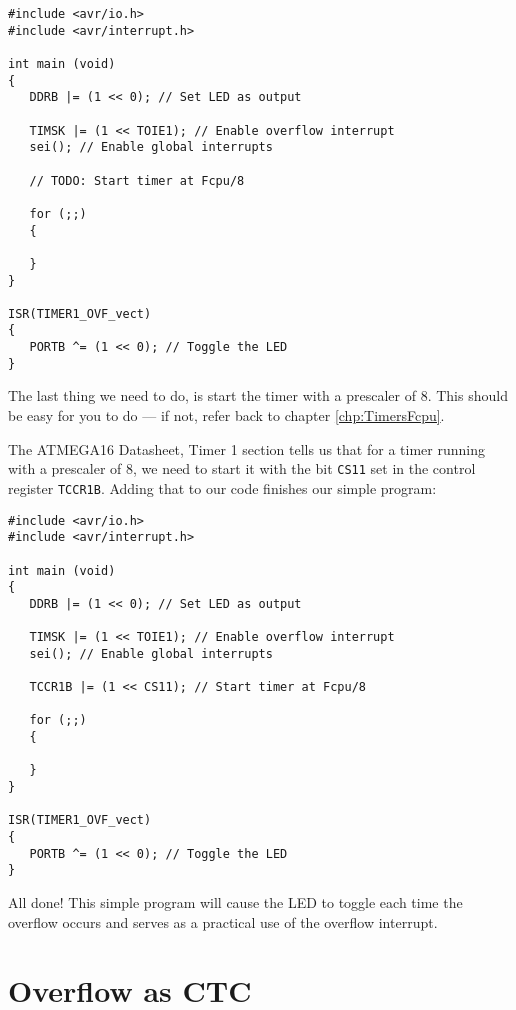 \documentclass[a4paper,oneside,notitlepage]{book}
\begin{document}
\begin{center}
\begin{lstlisting}
#include <avr/io.h>
#include <avr/interrupt.h>

int main (void)
{
   DDRB |= (1 << 0); // Set LED as output

   TIMSK |= (1 << TOIE1); // Enable overflow interrupt
   sei(); // Enable global interrupts

   // TODO: Start timer at Fcpu/8

   for (;;)
   {

   }
}

ISR(TIMER1_OVF_vect)
{
   PORTB ^= (1 << 0); // Toggle the LED
}
\end{lstlisting}
\end{center}

The last thing we need to do, is start the timer with a prescaler of 8. This should be easy for you to do --- if not, refer back to chapter \ref{chp:TimersFcpu}.

The ATMEGA16 Datasheet, Timer 1 section tells us that for a timer running with a prescaler of 8, we need to start it with the bit \texttt{CS11} set in the control register \texttt{TCCR1B}. Adding that to our code finishes our simple program:

\begin{center}
\begin{lstlisting}
#include <avr/io.h>
#include <avr/interrupt.h>

int main (void)
{
   DDRB |= (1 << 0); // Set LED as output

   TIMSK |= (1 << TOIE1); // Enable overflow interrupt
   sei(); // Enable global interrupts

   TCCR1B |= (1 << CS11); // Start timer at Fcpu/8

   for (;;)
   {

   }
}

ISR(TIMER1_OVF_vect)
{
   PORTB ^= (1 << 0); // Toggle the LED
}
\end{lstlisting}
\end{center}

All done! This simple program will cause the LED to toggle each time the overflow occurs and serves as a practical use of the overflow interrupt.


\label{chp:OverflowCTC}
\chapter{Overflow as CTC}
\end{document}
